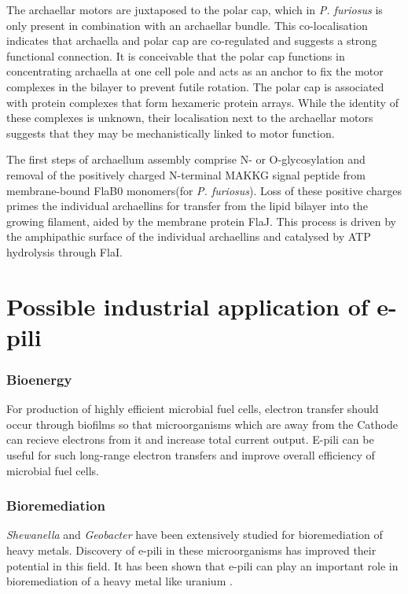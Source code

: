 \documentclass[fontsize=12pt,headsepline=true, bibliography=totocnumbered, twoside]{scrbook} %
\begin{document}
The archaellar motors are juxtaposed to the polar cap, which in \textit{P. furiosus} is only present in combination with an archaellar bundle. This co-localisation indicates that archaella and polar cap are co-regulated and suggests a strong functional connection. It is conceivable that the polar cap functions in concentrating archaella at one cell pole and acts as an anchor to fix the motor complexes in the bilayer to prevent futile rotation. The polar cap is associated with protein complexes that form hexameric protein arrays. While the identity of these complexes is unknown, their localisation next to the archaellar motors suggests that they may be mechanistically linked to motor function.

The first steps of archaellum assembly comprise N- or O-glycosylation and removal of the positively charged N-terminal MAKKG signal peptide from membrane-bound FlaB0 monomers(for \textit{P. furiosus}). Loss of these positive charges primes the individual archaellins for transfer from the lipid bilayer into the growing filament, aided by the membrane protein FlaJ. This process is driven by the amphipathic surface of the individual archaellins and catalysed by ATP hydrolysis through FlaI.

\section{Possible industrial application of e-pili}

\vspace{0.5cm}

\subsubsection{Bioenergy} 


For production of highly efficient microbial fuel cells, electron transfer should occur through biofilms so that microorganisms which are away from the Cathode can recieve electrons from it and increase total current output. E-pili can be useful for such long-range electron transfers and improve overall efficiency of microbial fuel cells\citep{sure2016microbial}.


\vspace{0.5cm}

\subsubsection{Bioremediation}


 \textit{Shewanella} and \textit{Geobacter} have been extensively studied for bioremediation of heavy metals. Discovery of e-pili in these microorganisms has improved their potential in this field. It has been shown that e-pili can play an important role in bioremediation of a heavy metal like uranium \citep{cologgi2011extracellular, sure2016microbial}.
\end{document}

